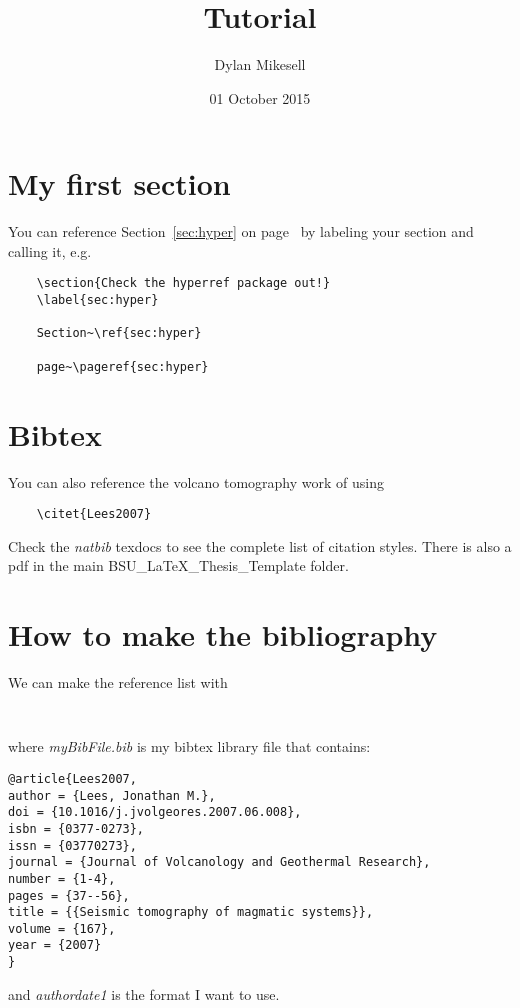 \documentclass{article}
\author{Dylan Mikesell} %
\title{\latex Tutorial} %
\date{01 October 2015} %
\begin{document}
\maketitle %

\newpage

\tableofcontents %

\newpage

\section{My first section} %
\label{sec:firstSection}

You can reference Section~\ref{sec:hyper} on page~\pageref{sec:hyper} by labeling your section and calling it, e.g.

\begin{verbatim}
	\section{Check the hyperref package out!}
	\label{sec:hyper}

	Section~\ref{sec:hyper} 

	page~\pageref{sec:hyper}
\end{verbatim}

\section{Bibtex} %

You can also reference the volcano tomography work of \citet{Lees2007} using
\begin{verbatim}
	\citet{Lees2007}
\end{verbatim}
Check the \textit{natbib} texdocs to see the complete list of citation styles. There is also a pdf in the main BSU\_LaTeX\_Thesis\_Template folder.

\section{How to make the bibliography}

We can make the reference list with
\begin{verbatim}


\end{verbatim}
where \textit{myBibFile.bib} is my bibtex library file that contains:
\begin{verbatim}
@article{Lees2007,
author = {Lees, Jonathan M.},
doi = {10.1016/j.jvolgeores.2007.06.008},
isbn = {0377-0273},
issn = {03770273},
journal = {Journal of Volcanology and Geothermal Research},
number = {1-4},
pages = {37--56},
title = {{Seismic tomography of magmatic systems}},
volume = {167},
year = {2007}
}
\end{verbatim}
and \textit{authordate1} is the format I want to use.
\end{document}
